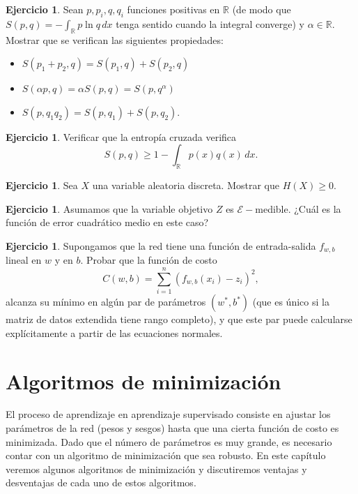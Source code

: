 \documentclass[12pt, a4paper]{amsbook}
\newcommand{\R}{{\mathbb R}}
\newcommand{\Ec}{{\mathcal E}}
\theoremstyle{remark}
\theoremstyle{definition}
\newtheorem{ejer}[teo]{Ejercicio}
\numberwithin{section}{chapter}
\numberwithin{subsection}{section}
\numberwithin{equation}{section}
\numberwithin{figure}{chapter}
\begin{document}
\begin{ejer}
Sean $p, p_i, q, q_i$ funciones positivas en $\R$ (de modo que $S(p,q)=-\int_\R p\ln q\,dx$ tenga sentido cuando la integral converge) y $\alpha\in \R$. Mostrar que se verifican las siguientes propiedades:
\begin{itemize}
\item[(a)] $S(p_1 + p_2, q) = S(p_1, q) + S(p_2, q)$

\item[(b)] $S(\alpha p, q) = \alpha S(p, q) = S(p, q^\alpha)$

\item [(c)] $S(p, q_1 q_2) = S(p, q_1) + S(p, q_2)$.
\end{itemize}
\end{ejer}

\begin{ejer}
Verificar que la entropía cruzada verifica
$$
S(p, q)\ge 1-\int_\R p(x) q(x)\, dx.
$$
\end{ejer}

\begin{ejer}
Sea $X$ una variable aleatoria discreta. Mostrar que $H(X)\ge 0$.
\end{ejer}

\begin{ejer}
Asumamos que la variable objetivo $Z$ es $\Ec-$medible. ¿Cuál es la función de error cuadrático medio en este caso?
\end{ejer}

\begin{ejer}
Supongamos que la red tiene una función de entrada-salida $f_{w, b}$ lineal en $w$ y en $b$. Probar que la función de costo
$$
C(w, b) = \sum_{i=1}^n (f_{w, b}(x_i) - z_i)^2,
$$
alcanza su mínimo en algún par de parámetros $(w^*, b^*)$ (que es único si la matriz de datos extendida tiene rango completo), y que este par puede calcularse explícitamente a partir de las ecuaciones normales.
\end{ejer}


\chapter{Algoritmos de minimización}\label{cap4}

El proceso de aprendizaje en aprendizaje supervisado consiste en ajustar los parámetros de la red (pesos y sesgos) hasta que una cierta función de costo es minimizada. Dado que el número de parámetros es muy grande, es necesario contar con un algoritmo de minimización que sea robusto. En este capítulo veremos algunos algoritmos de minimización y discutiremos ventajas y desventajas de cada uno de estos algoritmos.
\end{document}
